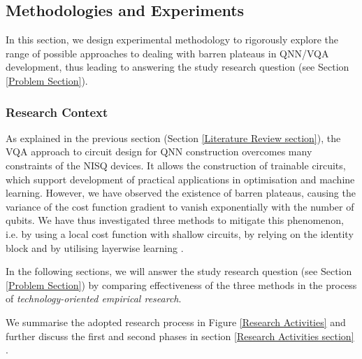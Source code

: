 \subsection{Methodologies and Experiments}
In this section, we design experimental methodology to rigorously explore the range of possible approaches to dealing with barren plateaus in QNN/VQA development, thus leading to answering the study research question (see Section \ref{Problem Section}).

\subsubsection{Research Context}

As explained in the previous section (Section \ref{Literature Review section}), the VQA approach to circuit design for QNN construction overcomes many constraints of the NISQ devices. It allows the construction of trainable circuits, which support development of practical applications in optimisation and machine learning.
However, we have observed the existence of barren plateaus, causing the variance of the cost function gradient to vanish exponentially with the number of qubits.
We have thus investigated three methods to mitigate this phenomenon, i.e. by using a local cost function with shallow circuits, by relying on the identity block and by utilising layerwise learning \cite{cerezoCostFunctionDependent2021, liuParameterInitializationMethod2021, skolikLayerwiseLearningQuantum2021}.

In the following sections, we will answer the study research question (see Section \ref{Problem Section}) by comparing effectiveness of the three methods in the process of \emph{technology-oriented empirical research}.

We summarise the adopted research process in Figure \ref{Research Activities} and further discuss the first and second phases in section \ref{Research Activities section} 
.

